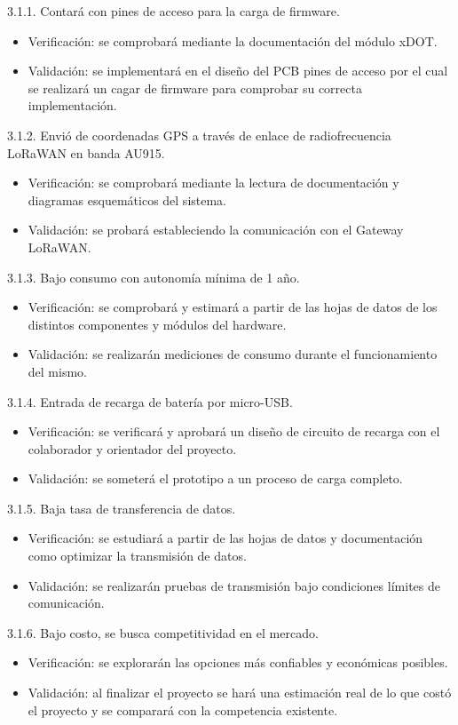 \documentclass[11pt]{charter}
\begin{document}
3.1.1. Contará con pines de acceso para la carga de firmware.
\begin{itemize}
	\item Verificación: se comprobará mediante la documentación del módulo xDOT. 
	\item Validación: se implementará en el diseño del PCB pines de acceso por el cual se realizará un cagar de firmware para comprobar su correcta implementación. 
\end{itemize}

3.1.2. Envió de coordenadas GPS a través de enlace de radiofrecuencia LoRaWAN en banda AU915.
\begin{itemize}
	\item Verificación: se comprobará mediante la lectura de documentación y diagramas esquemáticos del sistema. 
	\item Validación: se probará estableciendo la comunicación con el Gateway LoRaWAN.  
\end{itemize}

3.1.3. Bajo consumo con autonomía mínima de 1 año.
\begin{itemize}
	\item Verificación: se comprobará y estimará a partir de las hojas de datos de los distintos componentes y módulos del hardware. 
	\item Validación: se realizarán mediciones de consumo durante el funcionamiento del mismo. 
\end{itemize}

3.1.4. Entrada de recarga de batería por micro-USB.
\begin{itemize}
	\item Verificación: se verificará y aprobará un diseño de circuito de recarga con el colaborador y orientador del proyecto. 
	\item Validación: se someterá el prototipo a un proceso de carga completo. 
\end{itemize}

3.1.5. Baja tasa de transferencia de datos. 
\begin{itemize}
	\item Verificación: se estudiará a partir de las hojas de datos y documentación como optimizar la transmisión de datos. 
	\item Validación: se realizarán pruebas de transmisión bajo condiciones límites de comunicación. 
\end{itemize}

3.1.6. Bajo costo, se busca competitividad en el mercado.
\begin{itemize}
	\item Verificación: se explorarán las opciones más confiables y económicas posibles. 
	\item Validación: al finalizar el proyecto se hará una estimación real de lo que costó el proyecto y se comparará con la competencia existente. 
\end{itemize}
\end{document}
